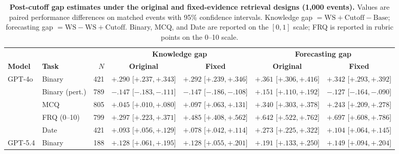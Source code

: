 \begin{table}[p]
\centering
\footnotesize

\caption{
\textbf{Post-cutoff gap estimates under the original and fixed-evidence retrieval designs (1,000 events).}
Values are paired performance differences on matched events with 95\%
confidence intervals.
Knowledge gap $=\mathrm{WS+Cutoff}-\mathrm{Base}$;
forecasting gap $=\mathrm{WS}-\mathrm{WS+Cutoff}$.
Binary, MCQ, and Date are reported on the $[0,1]$ scale; FRQ is reported
in rubric points on the 0--10 scale.
}
\label{tab:gaps_post}

\setlength{\tabcolsep}{4pt}
\renewcommand{\arraystretch}{1.12}

\begin{tabular}{l l r c c c c}
\toprule
& & & \multicolumn{2}{c}{\textbf{Knowledge gap}} & \multicolumn{2}{c}{\textbf{Forecasting gap}} \\
\cmidrule(lr){4-5}
\cmidrule(lr){6-7}
\textbf{Model} & \textbf{Task} & $N$ & \textbf{Original} & \textbf{Fixed} & \textbf{Original} & \textbf{Fixed} \\
\midrule

GPT-4o
& Binary
& 421
& $+.290$ {\tiny[$+.237,+.343$]}
& $+.292$ {\tiny[$+.239,+.346$]}
& $+.361$ {\tiny[$+.306,+.416$]}
& $+.342$ {\tiny[$+.293,+.392$]} \\


& Binary (pert.)
& 789
& $-.147$ {\tiny[$-.183,-.111$]}
& $-.147$ {\tiny[$-.186,-.108$]}
& $+.151$ {\tiny[$+.110,+.192$]}
& $-.127$ {\tiny[$-.164,-.090$]} \\


& MCQ
& 805
& $+.045$ {\tiny[$+.010,+.080$]}
& $+.097$ {\tiny[$+.063,+.131$]}
& $+.340$ {\tiny[$+.303,+.378$]}
& $+.243$ {\tiny[$+.209,+.278$]} \\


& FRQ (0--10)
& 799
& $+.297$ {\tiny[$+.223,+.371$]}
& $+.485$ {\tiny[$+.408,+.562$]}
& $+.642$ {\tiny[$+.522,+.762$]}
& $+.697$ {\tiny[$+.608,+.786$]} \\


& Date
& 421
& $+.093$ {\tiny[$+.056,+.129$]}
& $+.078$ {\tiny[$+.042,+.114$]}
& $+.273$ {\tiny[$+.225,+.322$]}
& $+.104$ {\tiny[$+.064,+.145$]} \\

\addlinespace

GPT-5.4
& Binary
& 188
& $+.128$ {\tiny[$+.061,+.195$]}
& $+.128$ {\tiny[$+.055,+.201$]}
& $+.191$ {\tiny[$+.133,+.250$]}
& $+.149$ {\tiny[$+.094,+.204$]} \\



\end{tabular}
\end{table}
